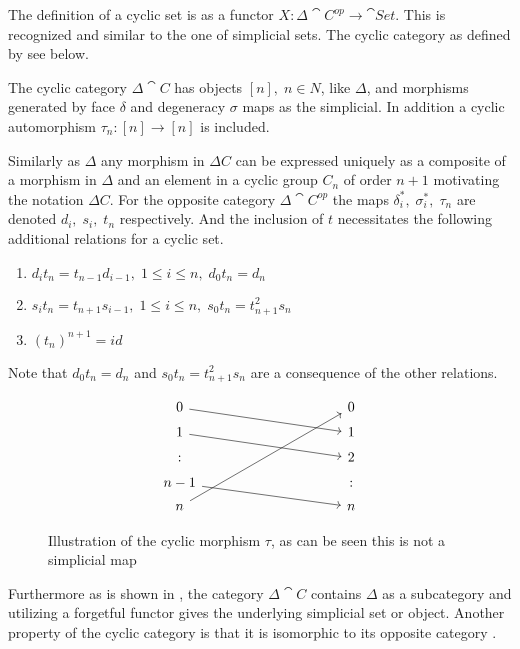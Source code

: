 \documentclass[../../main.tex]{subfiles}
\begin{document}
    The definition of a cyclic set is as a functor $X:\Delta \cat{C^{op}} \to \cat{Set}$. This is recognized and similar to the one of simplicial sets. The cyclic category as defined by \cite{loday-cyclic} see below.
    
    \begin{definition}
        The cyclic category $\Delta \cat{C}$ has objects $[n], \;n\in N$, like $\Delta$, and morphisms generated by face $\delta$ and degeneracy $\sigma$ maps as the simplicial. In addition a cyclic automorphism $\tau_n:[n]\to [n]$ is included.
    \end{definition}

    Similarly as $\Delta$ any morphism in $\Delta C$ can be expressed uniquely as a composite of a morphism in $\Delta$ and an element in a cyclic group $C_n$ of order $n+1$ motivating the notation $\Delta C$. For the opposite category $\Delta \cat{C^{op}}$ the maps $\delta_i^*, \; \sigma_i^*,\;\tau_n$ are denoted $d_i,\; s_i, \; t_n$ respectively. And the inclusion of $t$ necessitates the following additional relations for a cyclic set.
    \begin{enumerate}
        \item $d_it _n = t_{n-1}d_{i-1},\; 1 \leq i\leq n, \; d_0t_n=d_n$
        \item $s_i t _n = t_{n+1}s_{i-1},\; 1 \leq i\leq n, \; s_0t_n=t_{n+1}^2s_n$
        \item $(t_{n})^{n+1}=id$
    \end{enumerate}
    Note that $d_0t_n=d_n$ and $s_0t_n=t_{n+1}^2s_n$ are a consequence of the other relations. 
    \begin{figure}[H]
        \[
        \begin{tikzcd}[row sep = 1ex, column sep = 10em]
            0 \arrow[dr] & 0 \\
            1 \arrow[dr] & 1 \\
            :  & 2 \\
            n-1 \arrow[dr] & :\\
            n \arrow[uuuur] & n            
        \end{tikzcd}   
        \]
        \caption{Illustration of the cyclic morphism $\tau$, as can be seen this is not a simplicial map}
    \end{figure}


    Furthermore as is shown in \cite{loday-cyclic}, the category $\Delta \cat{C}$ contains $\Delta$ as a subcategory and utilizing a forgetful functor gives the underlying simplicial set or object. Another property of the cyclic category is that it is isomorphic to its opposite category \cite{loday-cyclic}.
\end{document}
